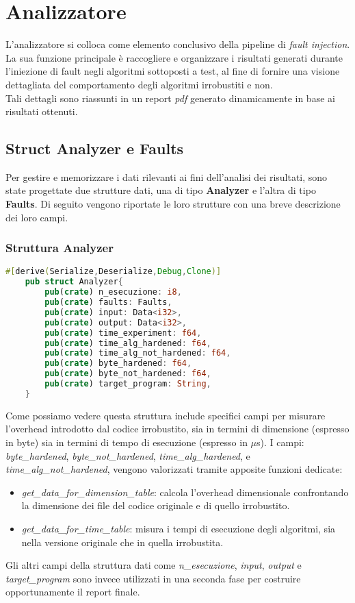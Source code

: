 \section{Analizzatore}\label{sec:analyzer}
L'analizzatore si colloca come elemento conclusivo della pipeline di \textit{fault injection}. La sua funzione principale è raccogliere e organizzare i risultati generati durante l'iniezione di fault negli algoritmi sottoposti a test, al fine di fornire una visione dettagliata del comportamento degli algoritmi irrobustiti e non.\\
Tali dettagli sono riassunti in un report \textit{pdf} generato dinamicamente in base ai risultati ottenuti. 

\subsection{Struct Analyzer e Faults}
Per gestire e memorizzare i dati rilevanti ai fini dell'analisi dei risultati, sono state progettate due strutture dati, una di tipo \textbf{Analyzer} e l'altra di tipo \textbf{Faults}. Di seguito vengono riportate le loro strutture con una breve descrizione dei loro campi.
\subsubsection{Struttura Analyzer}
\begin{lstlisting}[language=rust, style=boxed]
    #[derive(Serialize,Deserialize,Debug,Clone)]
    pub struct Analyzer{
        pub(crate) n_esecuzione: i8,
        pub(crate) faults: Faults,
        pub(crate) input: Data<i32>,
        pub(crate) output: Data<i32>,
        pub(crate) time_experiment: f64,
        pub(crate) time_alg_hardened: f64,
        pub(crate) time_alg_not_hardened: f64,
        pub(crate) byte_hardened: f64,
        pub(crate) byte_not_hardened: f64,
        pub(crate) target_program: String,
    }
\end{lstlisting}
Come possiamo vedere questa struttura include specifici campi per misurare l'overhead introdotto dal codice irrobustito, sia in termini di dimensione (espresso in byte) sia in termini di tempo di esecuzione (espresso in $\mu$s). I campi: \textit{byte\_hardened}, \textit{byte\_not\_hardened}, \textit{time\_alg\_hardened}, e \textit{time\_alg\_not\_hardened}, vengono valorizzati tramite apposite funzioni dedicate:
\begin{itemize}
    \item \textit{get\_data\_for\_dimension\_table}: calcola l'overhead dimensionale confrontando la dimensione dei file del codice originale e di quello irrobustito.
    \item \textit
    {get\_data\_for\_time\_table}: misura i tempi di esecuzione degli algoritmi, sia nella versione originale che in quella irrobustita.
\end{itemize}
Gli altri campi della struttura dati come \textit{n\_esecuzione}, \textit{input}, \textit{output} e \textit{target\_program} sono invece utilizzati in una seconda fase per costruire opportunamente il report finale.

